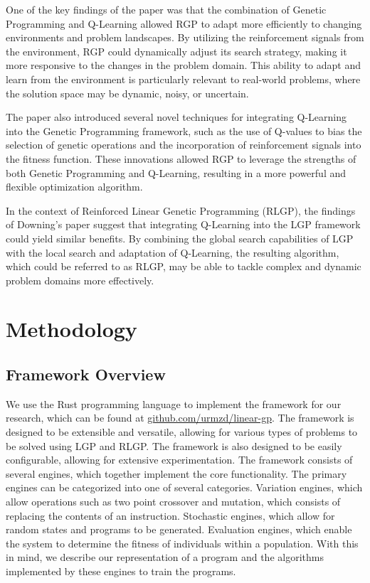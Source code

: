 \documentclass[12pt, final]{dalcsthesis}
\begin{document}
One of the key findings of the paper was that the combination of Genetic Programming and Q-Learning allowed RGP to adapt more efficiently to changing environments and problem landscapes. By utilizing the reinforcement signals from the environment, RGP could dynamically adjust its search strategy, making it more responsive to the changes in the problem domain. This ability to adapt and learn from the environment is particularly relevant to real-world problems, where the solution space may be dynamic, noisy, or uncertain.

The paper also introduced several novel techniques for integrating Q-Learning into the Genetic Programming framework, such as the use of Q-values to bias the selection of genetic operations and the incorporation of reinforcement signals into the fitness function. These innovations allowed RGP to leverage the strengths of both Genetic Programming and Q-Learning, resulting in a more powerful and flexible optimization algorithm.

In the context of Reinforced Linear Genetic Programming (RLGP), the findings of Downing's paper suggest that integrating Q-Learning into the LGP framework could yield similar benefits. By combining the global search capabilities of LGP with the local search and adaptation of Q-Learning, the resulting algorithm, which could be referred to as RLGP, may be able to tackle complex and dynamic problem domains more effectively.

\chapter{Methodology}

\section{Framework Overview}
We use the Rust programming language to implement the framework for our research, which can be found at \href{https://github.com/urmzd/linear-gp}{github.com/urmzd/linear-gp}. The framework is designed to be extensible and versatile, allowing
for various types of problems to be solved using LGP and RLGP. The framework is also designed to be easily configurable, allowing for extensive experimentation. The framework consists of several engines, which together implement the core functionality. The primary engines can be categorized into one of several categories. Variation engines, which allow operations such as two point crossover and mutation, which consists of replacing the contents of an instruction. Stochastic engines, which allow for random states and programs to be generated. Evaluation engines, which enable the system to determine the fitness of individuals within a population. With this in mind, we describe our representation of a program and the algorithms implemented by these engines to train the programs.
\end{document}
